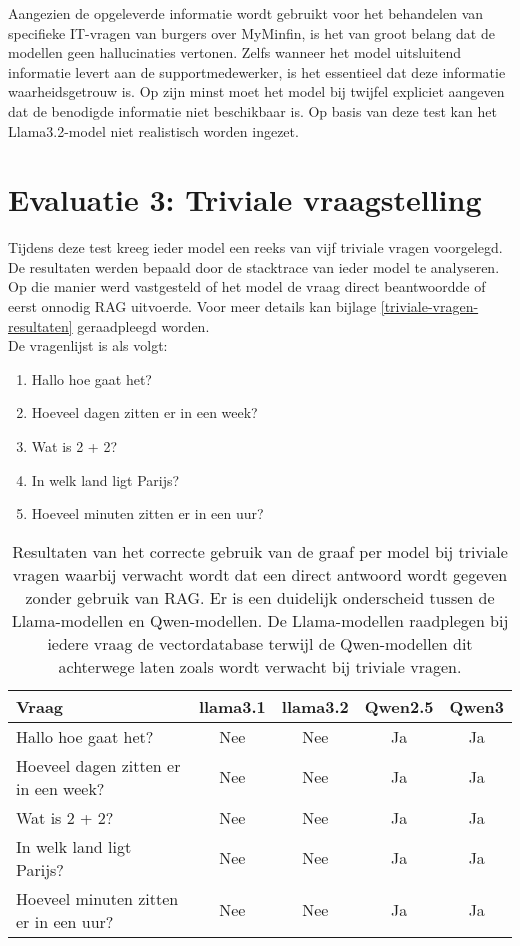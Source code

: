 Aangezien de opgeleverde informatie wordt gebruikt voor het behandelen van specifieke IT-vragen van burgers over MyMinfin, is het van groot belang dat de modellen geen hallucinaties vertonen. Zelfs wanneer het model uitsluitend informatie levert aan de supportmedewerker, is het essentieel dat deze informatie waarheidsgetrouw is. Op zijn minst moet het model bij twijfel expliciet aangeven dat de benodigde informatie niet beschikbaar is. Op basis van deze test kan het Llama3.2-model niet realistisch worden ingezet.

\section{Evaluatie 3: Triviale vraagstelling}

Tijdens deze test kreeg ieder model een reeks van vijf triviale vragen voorgelegd. De resultaten werden bepaald door de stacktrace van ieder model te analyseren. Op die manier werd vastgesteld of het model de vraag direct beantwoordde of eerst onnodig RAG uitvoerde. Voor meer details kan bijlage \ref{triviale-vragen-resultaten} geraadpleegd worden.
\\[1em]
De vragenlijst is als volgt:

\begin{enumerate}
    \item Hallo hoe gaat het?
    \item Hoeveel dagen zitten er in een week?
    \item Wat is 2 + 2?
    \item In welk land ligt Parijs?
    \item Hoeveel minuten zitten er in een uur?
\end{enumerate}

\begin{table}[H]
    \centering
    \begin{tabular}{|l|c|c|c|c|}
        \hline
        \textbf{Vraag} & \textbf{llama3.1} & \textbf{llama3.2} & \textbf{Qwen2.5} & \textbf{Qwen3} \\
        \hline
        Hallo hoe gaat het? & Nee & Nee & Ja & Ja \\
        Hoeveel dagen zitten er in een week? & Nee & Nee & Ja & Ja \\
        Wat is 2 + 2? & Nee & Nee & Ja & Ja \\
        In welk land ligt Parijs? & Nee & Nee & Ja & Ja \\
        Hoeveel minuten zitten er in een uur? & Nee & Nee & Ja & Ja \\
        \hline
    \end{tabular}
    \caption{Resultaten van het correcte gebruik van de graaf per model bij triviale vragen waarbij verwacht wordt dat een direct antwoord wordt gegeven zonder gebruik van RAG. Er is een duidelijk onderscheid tussen de Llama-modellen en Qwen-modellen. De Llama-modellen raadplegen bij iedere vraag de vectordatabase terwijl de Qwen-modellen dit achterwege laten zoals wordt verwacht bij triviale vragen.}
    
\end{table}


